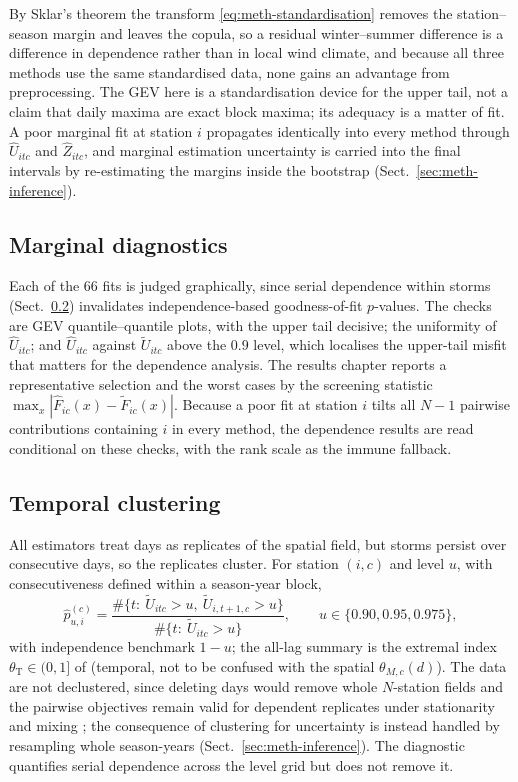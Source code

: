 By Sklar's theorem the transform \eqref{eq:meth-standardisation} removes the station--season margin and leaves the copula, so a residual winter--summer difference is a difference in dependence rather than in local wind climate, and because all three methods use the same standardised data, none gains an advantage from preprocessing. The GEV here is a standardisation device for the upper tail, not a claim that daily maxima are exact block maxima; its adequacy is a matter of fit. A poor marginal fit at station \(i\) propagates identically into every method through \(\widehat U_{itc}\) and \(\widehat Z_{itc}\), and marginal estimation uncertainty is carried into the final intervals by re-estimating the margins inside the bootstrap (Sect.~\ref{sec:meth-inference}).

\subsection{Marginal diagnostics}\label{sec:meth-marg-diag}

Each of the \(66\) fits is judged graphically, since serial dependence within storms (Sect.~\ref{sec:meth-temporal}) invalidates independence-based goodness-of-fit \(p\)-values. The checks are GEV quantile--quantile plots, with the upper tail decisive; the uniformity of \(\widehat U_{itc}\); and \(\widehat U_{itc}\) against \(\widetilde U_{itc}\) above the \(0.9\) level, which localises the upper-tail misfit that matters for the dependence analysis. The results chapter reports a representative selection and the worst cases by the screening statistic \(\max_x|\widehat F_{ic}(x)-\widetilde F_{ic}(x)|\). Because a poor fit at station \(i\) tilts all \(N-1\) pairwise contributions containing \(i\) in every method, the dependence results are read conditional on these checks, with the rank scale as the immune fallback.

\subsection{Temporal clustering}\label{sec:meth-temporal}

All estimators treat days as replicates of the spatial field, but storms persist over consecutive days, so the replicates cluster. For station \((i,c)\) and level \(u\), with consecutiveness defined within a season-year block,
\begin{equation}
  \widehat p^{(c)}_{u,i}
  =\frac{\#\{t:\ \widetilde U_{itc}>u,\ \widetilde U_{i,t+1,c}>u\}}
  {\#\{t:\ \widetilde U_{itc}>u\}},
  \qquad u\in\{0.90,0.95,0.975\},
\end{equation}
with independence benchmark \(1-u\); the all-lag summary is the extremal index \(\theta_{\mathrm T}\in(0,1]\) of \citet{ferro2003} (temporal, not to be confused with the spatial \(\theta_{M,c}(d)\)). The data are not declustered, since deleting days would remove whole \(N\)-station fields and the pairwise objectives remain valid for dependent replicates under stationarity and mixing \citep{huserdavison2014}; the consequence of clustering for uncertainty is instead handled by resampling whole season-years (Sect.~\ref{sec:meth-inference}). The diagnostic quantifies serial dependence across the level grid but does not remove it.


